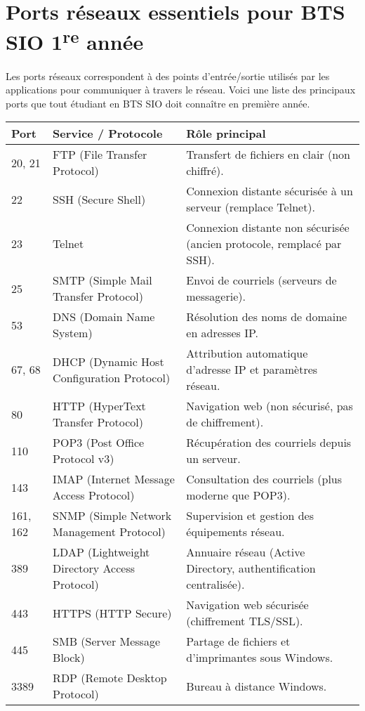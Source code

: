 \documentclass[a4paper,11pt]{article}
\begin{document}
\section*{Ports réseaux essentiels pour BTS SIO 1\textsuperscript{re} année}

\begin{tcolorbox}[colback=blue!5,colframe=blue!75!black,title=Introduction]
Les ports réseaux correspondent à des points d’entrée/sortie utilisés par les applications pour communiquer à travers le réseau.  
Voici une liste des principaux ports que tout étudiant en BTS SIO doit connaître en première année.
\end{tcolorbox}

\begin{longtable}{|p{2cm}|p{4cm}|p{8cm}|}
\hline
\textbf{Port} & \textbf{Service / Protocole} & \textbf{Rôle principal} \\
\hline
20, 21 & FTP (File Transfer Protocol) & Transfert de fichiers en clair (non chiffré). \\
\hline
22 & SSH (Secure Shell) & Connexion distante sécurisée à un serveur (remplace Telnet). \\
\hline
23 & Telnet & Connexion distante non sécurisée (ancien protocole, remplacé par SSH). \\
\hline
25 & SMTP (Simple Mail Transfer Protocol) & Envoi de courriels (serveurs de messagerie). \\
\hline
53 & DNS (Domain Name System) & Résolution des noms de domaine en adresses IP. \\
\hline
67, 68 & DHCP (Dynamic Host Configuration Protocol) & Attribution automatique d’adresse IP et paramètres réseau. \\
\hline
80 & HTTP (HyperText Transfer Protocol) & Navigation web (non sécurisé, pas de chiffrement). \\
\hline
110 & POP3 (Post Office Protocol v3) & Récupération des courriels depuis un serveur. \\
\hline
143 & IMAP (Internet Message Access Protocol) & Consultation des courriels (plus moderne que POP3). \\
\hline
161, 162 & SNMP (Simple Network Management Protocol) & Supervision et gestion des équipements réseau. \\
\hline
389 & LDAP (Lightweight Directory Access Protocol) & Annuaire réseau (Active Directory, authentification centralisée). \\
\hline
443 & HTTPS (HTTP Secure) & Navigation web sécurisée (chiffrement TLS/SSL). \\
\hline
445 & SMB (Server Message Block) & Partage de fichiers et d’imprimantes sous Windows. \\
\hline
3389 & RDP (Remote Desktop Protocol) & Bureau à distance Windows. \\
\hline
\end{longtable}
\end{document}
